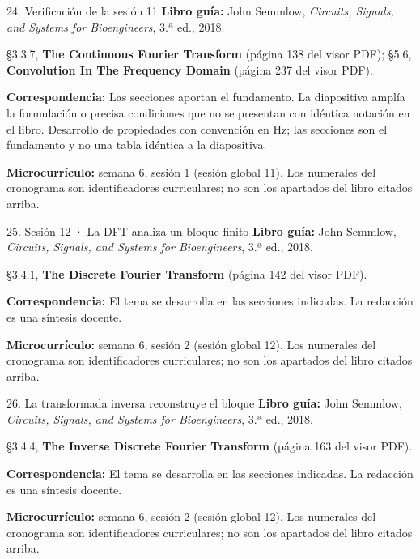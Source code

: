 \documentclass[
  10pt,
  ignorenonframetext,
  aspectratio=169,
  spanish,
]{beamer}
\begin{document}
\begin{frame}{24. Verificación de la sesión 11}
\label{verificaciuxf3n-de-la-sesiuxf3n-11}
\textbf{Libro guía:} John Semmlow, \emph{Circuits, Signals, and Systems
for Bioengineers}, 3.ª ed., 2018.

§3.3.7, \textbf{The Continuous Fourier Transform} (página 138 del visor
PDF); §5.6, \textbf{Convolution In The Frequency Domain} (página 237 del
visor PDF).

\textbf{Correspondencia:} Las secciones aportan el fundamento. La
diapositiva amplía la formulación o precisa condiciones que no se
presentan con idéntica notación en el libro. Desarrollo de propiedades
con convención en Hz; las secciones son el fundamento y no una tabla
idéntica a la diapositiva.

\textbf{Microcurrículo:} semana 6, sesión 1 (sesión global 11). Los
numerales del cronograma son identificadores curriculares; no son los
apartados del libro citados arriba.
\end{frame}

\begin{frame}{25. Sesión 12 · La DFT analiza un bloque finito}
\label{sesiuxf3n-12-la-dft-analiza-un-bloque-finito}
\textbf{Libro guía:} John Semmlow, \emph{Circuits, Signals, and Systems
for Bioengineers}, 3.ª ed., 2018.

§3.4.1, \textbf{The Discrete Fourier Transform} (página 142 del visor
PDF).

\textbf{Correspondencia:} El tema se desarrolla en las secciones
indicadas. La redacción es una síntesis docente.

\textbf{Microcurrículo:} semana 6, sesión 2 (sesión global 12). Los
numerales del cronograma son identificadores curriculares; no son los
apartados del libro citados arriba.
\end{frame}

\begin{frame}{26. La transformada inversa reconstruye el bloque}
\label{la-transformada-inversa-reconstruye-el-bloque}
\textbf{Libro guía:} John Semmlow, \emph{Circuits, Signals, and Systems
for Bioengineers}, 3.ª ed., 2018.

§3.4.4, \textbf{The Inverse Discrete Fourier Transform} (página 163 del
visor PDF).

\textbf{Correspondencia:} El tema se desarrolla en las secciones
indicadas. La redacción es una síntesis docente.

\textbf{Microcurrículo:} semana 6, sesión 2 (sesión global 12). Los
numerales del cronograma son identificadores curriculares; no son los
apartados del libro citados arriba.
\end{frame}
\end{document}

